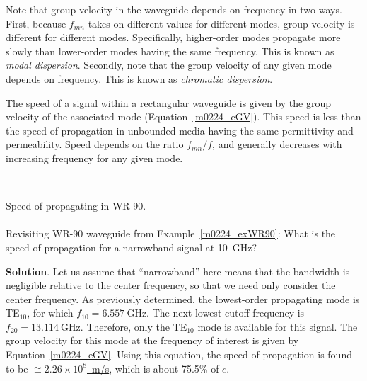 Note that group velocity in the waveguide depends on frequency in two ways.
First, because $f_{mn}$ takes on different values for different modes, group velocity is different for different modes.
Specifically, higher-order modes propagate more slowly than lower-order modes having the same frequency.
This is known as \emph{modal dispersion}.
Secondly, note that the group velocity of any given mode depends on frequency.
This is known as \emph{chromatic dispersion}.


\begin{mdframed}[backgroundcolor=yellow!20,nobreak=true] 
The speed of a signal within a rectangular waveguide is given by the group velocity of the associated mode (Equation~\ref{m0224_eGV}).
This speed is less than the speed of propagation in unbounded media having the same permittivity and permeability.
Speed depends on the ratio $f_{mn}/f$, and generally decreases with increasing frequency for any given mode.
\end{mdframed}

~\\ \begin{example} 
\begin{mdframed}[backgroundcolor=brown!20,linecolor=brown!20]\raggedright
Speed of propagating in WR-90. 
\\~\\
Revisiting WR-90 waveguide from Example~\ref{m0224_exWR90}:
What is the speed of propagation for a narrowband signal at 10~GHz?

{\bf Solution}. 
Let us assume that ``narrowband'' here means that the bandwidth is negligible relative to the center frequency, so that we need only consider the center frequency.
As previously determined, the lowest-order propagating mode is TE$_{10}$, for which $f_{10} = 6.557~\mbox{GHz}$.
The next-lowest cutoff frequency is $f_{20} = 13.114~\mbox{GHz}$.
Therefore, only the TE$_{10}$ mode is available for this signal.
The group velocity for this mode at the frequency of interest is given by Equation~\ref{m0224_eGV}.
Using this equation, the speed of propagation is found to be \underline{$\cong 2.26 \times 10^8$~m/s}, which is about 75.5\% of $c$.

\end{mdframed}
\end{example}




